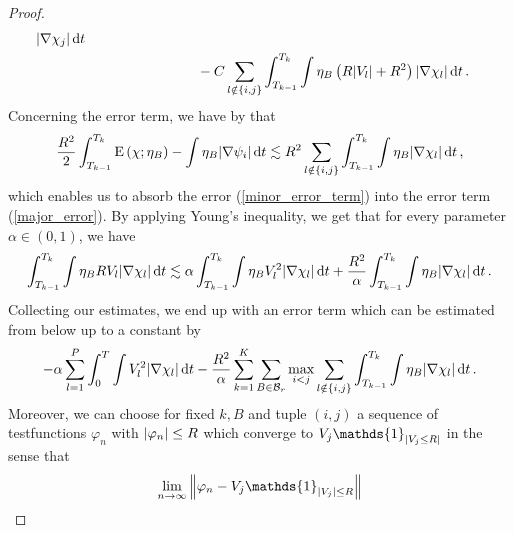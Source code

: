 \begin{proof}
\begin{align}
		\abs{ \nabla \chi_{ j } }
		\dd{ t }
		\\
		\label{major_error}
		& \qquad \qquad \qquad \qquad -
		C \sum_{ l \notin \{ i , j \} }
		\int_{ T_{ k - 1 } }^{ T_{ k } }
			\int
				\eta_{ B } 
				\left(
					R \abs{ V_{ l } }
					+
					R^{ 2 }
				\right)
			\abs{ \nabla \chi_{ l } }
		\dd{ t }.
	\end{align}
	Concerning the error term, we have by  
	that
	\begin{equation*}
				\frac{ R^{ 2 } }{ 2 }
		\int_{ T_{ k - 1 } }^{ T_{ k } }
		\operatorname{E} \left( \chi ; \eta_{ B } \right)
		-
		\int
		\eta_{ B }
		\abs{ \nabla \psi_{ i } }
		\dd{ t }
		\lesssim
		R^{ 2 }
		\sum_{ l \notin \{ i , j \} }
		\int_{ T_{ k - 1 } }^{ T_{ k } }
		\int
		\eta_{ B }
		\abs{ \nabla \chi_{ l } }
		\dd{ t },
	\end{equation*}
	which enables us to absorb the error (\ref{minor_error_term}) into the 
	error term  (\ref{major_error}).
	By applying Young's inequality, we get that for every parameter $ 
	\alpha \in ( 0 , 1 ) $, we have
	\begin{equation*}
		\int_{ T_{ k - 1 } }^{ T_{ k } }
			\int
				\eta_{ B } R V_{ l }
			\abs{ \nabla \chi_{ l } }
		\dd{ t }
		\lesssim
		\alpha
			\int_{ T_{ k - 1 } }^{ T_{ k } }
				\int
					\eta_{ B }
					V_{ l }^{ 2 }
				\abs{ \nabla \chi_{ l } }
			\dd{ t }
		+
		\frac{ R^{ 2 } }{ \alpha }
			\int_{ T_{ k - 1 } }^{ T_{k } }
				\int
					\eta_{ B }
				\abs{ \nabla \chi_{ l } }
			\dd{ t }.
	\end{equation*}
	Collecting our estimates, we end up with an error term which can be 
	estimated from below up to a constant by
	\begin{align*}
		- \alpha \sum_{ l = 1 }^{ P }
			\int_{ 0 }^{ T }
				\int
					V_{ l }^{ 2 }
				\abs{ \nabla \chi_{ l } }
			\dd{ t }
		-
		\frac{ R^{ 2 } }{ \alpha }
		\sum_{ k = 1 }^{ K }
			\sum_{ B \in \mathcal{ B }_{ r } }
				\max_{ i < j }
					\sum_{ l \notin \{ i , j \} }
						\int_{ T_{ k - 1 } }^{ T_{ k } }
							\int
								\eta_{ B }
							\abs{ \nabla \chi_{ l } }
						\dd{ t }.
	\end{align*}
	Moreover, we can choose for fixed $k , B $ and tuple $ (i, j ) $ a sequence 
	of testfunctions $ \varphi_{ n } $ with $ \abs{ \varphi_{ n } } \leq R $ 
	which converge to $ V_{ j } \mathds{ 1 }_{ \abs{ V_{ j } \leq R } } $
	in the sense that
	\begin{equation*}
		\lim_{ n \to \infty }
		\norm{ \varphi_{ n } - V_{ j } \mathds{ 1 }_{ \abs{ V_{ j } } \leq R } 
}
\end{equation*}
\end{proof}
